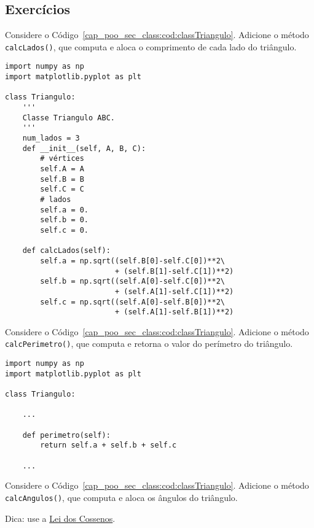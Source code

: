 \subsection{Exercícios}

\begin{exer}
  Considere o Código~\ref{cap_poo_sec_class:cod:classTriangulo}. Adicione o método \lstinline+calcLados()+, que computa e aloca o comprimento de cada lado do triângulo.
\end{exer}
\begin{resp}

\begin{lstlisting}
import numpy as np
import matplotlib.pyplot as plt

class Triangulo:
    '''
    Classe Triangulo ABC.
    '''
    num_lados = 3
    def __init__(self, A, B, C):
        # vértices
        self.A = A
        self.B = B
        self.C = C
        # lados
        self.a = 0.
        self.b = 0.
        self.c = 0.

    def calcLados(self):
        self.a = np.sqrt((self.B[0]-self.C[0])**2\
                         + (self.B[1]-self.C[1])**2)
        self.b = np.sqrt((self.A[0]-self.C[0])**2\
                         + (self.A[1]-self.C[1])**2)
        self.c = np.sqrt((self.A[0]-self.B[0])**2\
                         + (self.A[1]-self.B[1])**2)
\end{lstlisting}

\end{resp}

\begin{exer}
  Considere o Código~\ref{cap_poo_sec_class:cod:classTriangulo}. Adicione o método \lstinline+calcPerimetro()+, que computa e retorna o valor do perímetro do triângulo.
\end{exer}
\begin{resp}

\begin{lstlisting}
import numpy as np
import matplotlib.pyplot as plt

class Triangulo:

    ...

    def perimetro(self):
        return self.a + self.b + self.c

    ...
\end{lstlisting}

\end{resp}

\begin{exer}
  Considere o Código~\ref{cap_poo_sec_class:cod:classTriangulo}. Adicione o método \lstinline+calcAngulos()+, que computa e aloca os ângulos do triângulo.
\end{exer}
\begin{resp}
  Dica: use a \href{https://pt.wikipedia.org/wiki/Lei_dos_cossenos}{Lei dos Cossenos}.
\end{resp}

